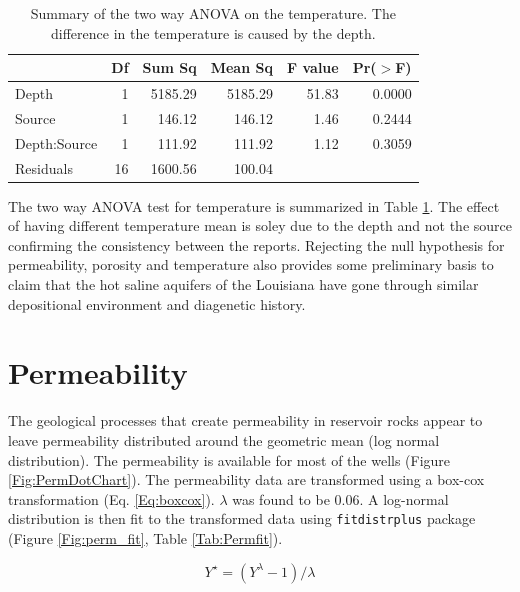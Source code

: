 \documentclass[review,authoryear, 12pt]{elsarticle}\usepackage[]{graphicx}\usepackage[]{color}
\begin{document}
\begin{table}[ht]
\centering
\begin{tabular}{lrrrrr}
  \hline
 & Df & Sum Sq & Mean Sq & F value & Pr($>$F) \\ 
  \hline
Depth        & 1 & 5185.29 & 5185.29 & 51.83 & 0.0000 \\ 
  Source       & 1 & 146.12 & 146.12 & 1.46 & 0.2444 \\ 
  Depth:Source & 1 & 111.92 & 111.92 & 1.12 & 0.3059 \\ 
  Residuals    & 16 & 1600.56 & 100.04 &  &  \\ 
   \hline
\end{tabular}
\caption{Summary of the two way ANOVA on the temperature. The difference in the temperature is caused by the depth.} 
\label{Tab:temp_anova}
\end{table}



The two way ANOVA test for temperature is summarized in Table \ref{Tab:temp_anova}. The effect of having different temperature mean is soley due to the depth and not the source confirming the consistency between the reports. Rejecting the null hypothesis for permeability, porosity and temperature also provides some preliminary basis to claim that the hot saline aquifers of the Louisiana have gone through similar depositional environment and diagenetic history.


\section{Permeability}
The geological processes that create permeability in reservoir rocks appear to leave permeability distributed around the geometric mean (log normal distribution). The permeability is available for most of the wells (Figure \ref{Fig:PermDotChart}). The permeability data are transformed using a box-cox transformation (Eq. \ref{Eq:boxcox}). $\lambda$ was found to be 0.06. A log-normal distribution is then fit to the transformed data using \texttt{fitdistrplus} package (Figure \ref{Fig:perm_fit}, Table \ref{Tab:Permfit}).

\begin{equation}
\label{Eq:boxcox}
Y^\star=(Y^\lambda-1)/\lambda 
\end{equation}
\end{document}
